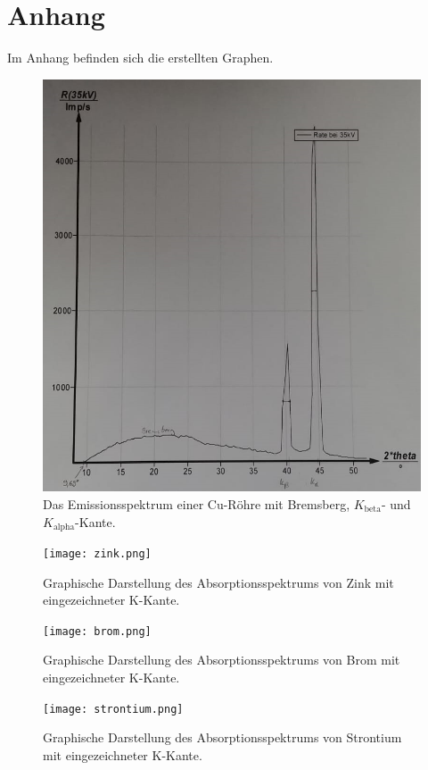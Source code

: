 \section{Anhang}
Im Anhang befinden sich die erstellten Graphen.
\begin{figure}[H]
  \centering
  \includegraphics{emission.png}
  \caption{Das Emissionsspektrum einer Cu-Röhre mit Bremsberg, $K_\text{beta}$- und $K_\text{alpha}$-Kante.}
  \label{fig:plot}
\end{figure}

\begin{figure}[H]
  \centering
  \texttt{[image: zink.png]}
  \caption{Graphische Darstellung des Absorptionsspektrums von Zink mit eingezeichneter K-Kante.}
  \label{fig:plot}
\end{figure}

\begin{figure}[H]
  \centering
  \texttt{[image: brom.png]}
  \caption{Graphische Darstellung des Absorptionsspektrums von Brom mit eingezeichneter K-Kante.}
  \label{fig:plot}
\end{figure}

\begin{figure}[H]
  \centering
  \texttt{[image: strontium.png]}
  \caption{Graphische Darstellung des Absorptionsspektrums von Strontium mit eingezeichneter K-Kante.}
  \label{fig:plot}
\end{figure}


